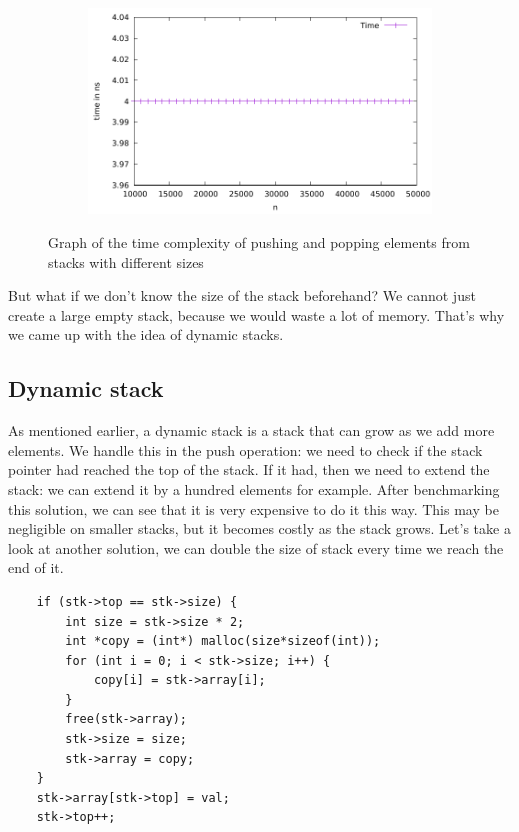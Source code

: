 \documentclass[a4paper,11pt]{article}
\begin{document}
    \begin{figure}[h]
        \centering
        \begin{subfigure}[b]{.5\textwidth}
            \centering
            \includegraphics[width=\textwidth]{./static/data} %
        \end{subfigure}
        \caption{Graph of the time complexity of pushing and popping elements from stacks with different sizes}
        \label{fig:graph_1}
    \end{figure}

    But what if we don't know the size of the stack beforehand?
    We cannot just create a large empty stack, because we would waste a lot of memory.
    That's why we came up with the idea of dynamic stacks.

    \subsection*{Dynamic stack}

    As mentioned earlier, a dynamic stack is a stack that can grow as we add more elements.
    We handle this in the push operation: we need to check if the stack pointer had reached the top of the stack.
    If it had, then we need to extend the stack: we can extend it by a hundred elements for example.
    After benchmarking this solution, we can see that it is very expensive to do it this way.
    This may be negligible on smaller stacks, but it becomes costly as the stack grows.
    Let's take a look at another solution, we can double the size of stack every time we reach the end of it.

    \begin{verbatim}
    if (stk->top == stk->size) {
        int size = stk->size * 2;
        int *copy = (int*) malloc(size*sizeof(int));
        for (int i = 0; i < stk->size; i++) {
            copy[i] = stk->array[i];
        }
        free(stk->array);
        stk->size = size;
        stk->array = copy;
    }
    stk->array[stk->top] = val;
    stk->top++;
    \end{verbatim}
\end{document}

